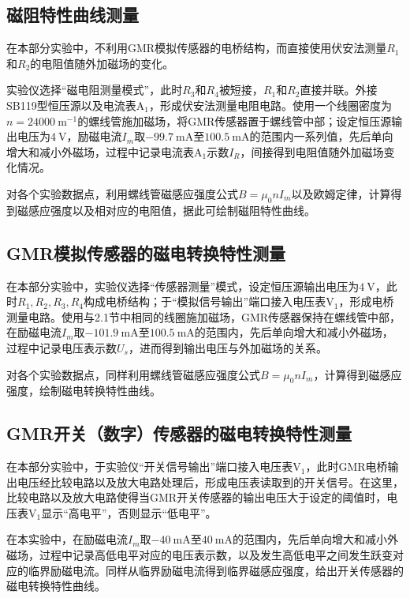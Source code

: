 \documentclass{thuemp}
\begin{document}
\subsection{磁阻特性曲线测量}

在本部分实验中，不利用GMR模拟传感器的电桥结构，而直接使用伏安法测量$R_1$和$R_2$的电阻值随外加磁场的变化。


实验仪选择“磁电阻测量模式”，此时$R_3$和$R_4$被短接，$R_1$和$R_2$直接并联。外接SB119型恒压源以及电流表$\mathrm{A_1}$，形成伏安法测量电阻电路。使用一个线圈密度为$n=24000~ \mathrm{m^{-1}}$的螺线管施加磁场，将GMR传感器置于螺线管中部；设定恒压源输出电压为$4~\mathrm{V}$，励磁电流$I_m$取$-99.7 ~ \mathrm{mA}$至$100.5 ~ \mathrm{mA}$的范围内一系列值，先后单向增大和减小外磁场，过程中记录电流表$\mathrm{A_1}$示数$I_R$，间接得到电阻值随外加磁场变化情况。


对各个实验数据点，利用螺线管磁感应强度公式$B=\mu_0 n I_m$以及欧姆定律，计算得到磁感应强度以及相对应的电阻值，据此可绘制磁阻特性曲线。

\subsection{GMR模拟传感器的磁电转换特性测量}

在本部分实验中，实验仪选择“传感器测量”模式，设定恒压源输出电压为$4~\mathrm{V}$，此时$R_1, R_2, R_3, R_4$构成电桥结构；于“模拟信号输出”端口接入电压表$\mathrm{V_1}$，形成电桥测量电路。使用与2.1节中相同的线圈施加磁场，GMR传感器保持在螺线管中部，在励磁电流$I_m$取$-101.9 ~ \mathrm{mA}$至$100.5 ~ \mathrm{mA}$的范围内，先后单向增大和减小外磁场，过程中记录电压表示数$U_s$，进而得到输出电压与外加磁场的关系。

对各个实验数据点，同样利用螺线管磁感应强度公式$B=\mu_0 n I_m$，计算得到磁感应强度，绘制磁电转换特性曲线。

\subsection{GMR开关（数字）传感器的磁电转换特性测量}

在本部分实验中，于实验仪“开关信号输出”端口接入电压表$\mathrm{V_1}$，此时GMR电桥输出电压经比较电路以及放大电路处理后，形成电压表读取到的开关信号。在这里，比较电路以及放大电路使得当GMR开关传感器的输出电压大于设定的阈值时，电压表$\mathrm{V_1}$显示“高电平”，否则显示“低电平”。

在本实验中，在励磁电流$I_m$取$-40 ~ \mathrm{mA}$至$40 ~ \mathrm{mA}$的范围内，先后单向增大和减小外磁场，过程中记录高低电平对应的电压表示数，以及发生高低电平之间发生跃变对应的临界励磁电流。同样从临界励磁电流得到临界磁感应强度，给出开关传感器的磁电转换特性曲线。
\end{document}
